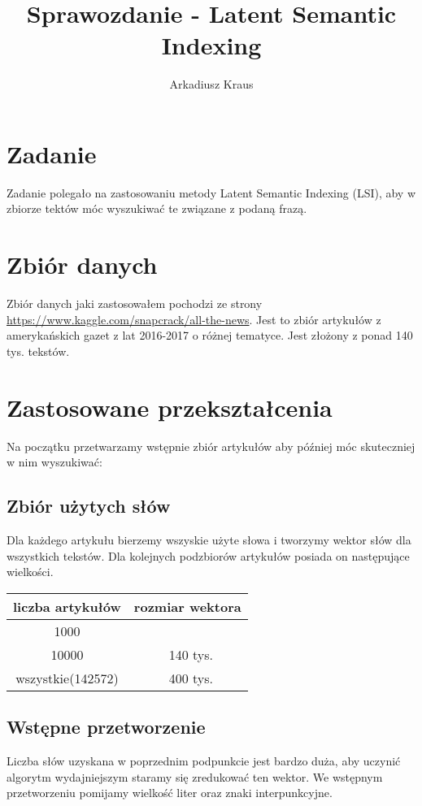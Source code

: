 \documentclass{article}
\begin{document}
\title{Sprawozdanie - Latent Semantic Indexing}
\author{Arkadiusz Kraus}

\maketitle


\section{Zadanie}
Zadanie polegało na zastosowaniu metody Latent Semantic Indexing (LSI), aby w zbiorze tektów móc wyszukiwać te związane z podaną frazą.

\section{Zbiór danych}
Zbiór danych jaki zastosowałem pochodzi ze strony \url{https://www.kaggle.com/snapcrack/all-the-news}. Jest to zbiór artykułów z amerykańskich gazet z lat 2016-2017 o różnej tematyce. Jest złożony z ponad 140 tys. tekstów.

\section{Zastosowane przekształcenia}
Na początku przetwarzamy wstępnie zbiór artykułów aby później móc skuteczniej w nim wyszukiwać:
\subsection{Zbiór użytych słów}
Dla każdego artykułu bierzemy wszyskie użyte słowa i tworzymy wektor słów dla wszystkich tekstów. Dla kolejnych podzbiorów artykułów posiada on następujące wielkości.
\begin{center}
	\begin{tabular}{c|c}
	liczba artykułów & rozmiar wektora \\ \hline
	1000 &  \\ \hline
	10000 & ~140 tys.\\ \hline
	wszystkie(142572) & ~400 tys.\\
	\end{tabular}
\end{center}
\subsection{Wstępne przetworzenie}
Liczba słów uzyskana w poprzednim podpunkcie jest bardzo duża, aby uczynić algorytm wydajniejszym staramy się zredukować ten wektor. We wstępnym przetworzeniu pomijamy wielkość liter oraz znaki interpunkcyjne.
\end{document}
